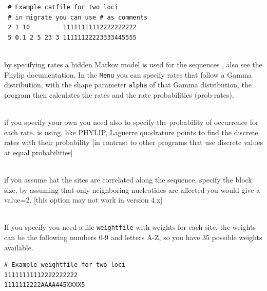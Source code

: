 \begin{description}
 \begin{small}
 \begin{verbatim}
 # Example catfile for two loci
 # in migrate you can use # as comments
 2 1 10         11111111112222222222
 5 0.1 2 5 23 3 11111122223333445555
\end{verbatim}
\end{small}
\item{}\\
by specifying rates  a hidden Markov model is used for the sequences \cite{felsenstein:1996:hmm}, also see the {\sc Phylip} documentation.
In the {\tt Menu} you can specify rates that follow
 a Gamma distribution,
with the shape parameter {\tt alpha} of that Gamma distribution,
the program then calculates the rates and the rate probabilities ({\bt prob-rates}). 
\item{}\\
if you specify your own {} you need also to specify 
the probability of occurrence for each rate. \migrate is using, like PHYLIP,  Laguerre quadrature points to find the discrete rates with their probability [in contrast to other programs that use discrete values at equal probabilities]

\item{}\\
if you assume hat the sites are correlated along the sequence, specify the block size, by assuming that only neighboring nucleotides are affected you would
give a value=2. [this option may not work in  version 4.x]

\item{}\\
If you specify {} you need a file {\tt weightfile} with weights for each
 site, the weights can be the following numbers 0-9 and letters A-Z,
 so you have 35 possible weights available.
 \begin{small}
 \begin{verbatim}
# Example weightfile for two loci
11111111112222222222
1111112222AAAA445XXXX5
\end{verbatim}
\end{small}


\end{description}
